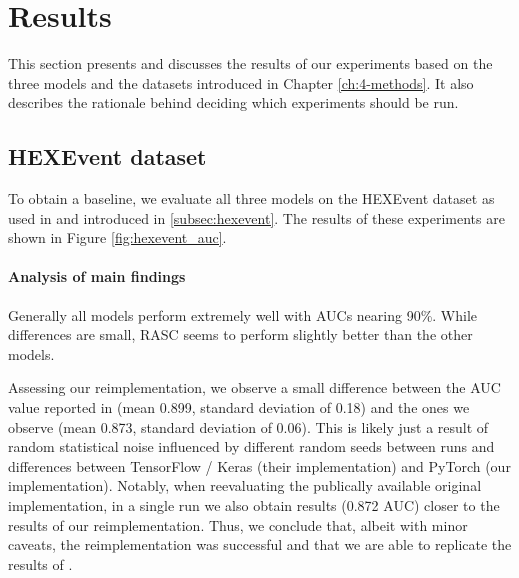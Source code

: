 \chapter{\label{ch:ch5-results}Results}

This section presents and discusses the results of our experiments based on the three models and the datasets introduced in Chapter \ref{ch:4-methods}. It also describes the rationale behind deciding which experiments should be run.

\section{HEXEvent dataset} \label{sec:hexevent_results} %
To obtain a baseline, we evaluate all three models on the HEXEvent dataset as used in \cite{dsc} and introduced in \ref{subsec:hexevent}. The results of these experiments are shown in Figure \ref{fig:hexevent_auc}.

\subsubsection{Analysis of main findings}
Generally all models perform extremely well with AUCs nearing 90\%. While differences are small, RASC seems to perform slightly better than the other models.

Assessing our reimplementation, we observe a small difference between the AUC value reported in \cite{dsc} (mean 0.899, standard deviation of 0.18) and the ones we observe (mean 0.873, standard deviation of 0.06). This is likely just a result of random statistical noise influenced by different random seeds between runs and differences between TensorFlow / Keras (their implementation) and PyTorch (our implementation). Notably, when reevaluating the publically available original implementation, in a single run we also obtain results (0.872 AUC) closer to the results of our reimplementation. 
Thus, we conclude that, albeit with minor caveats, the reimplementation was successful and that we are able to replicate the results of \cite{DSC}.

